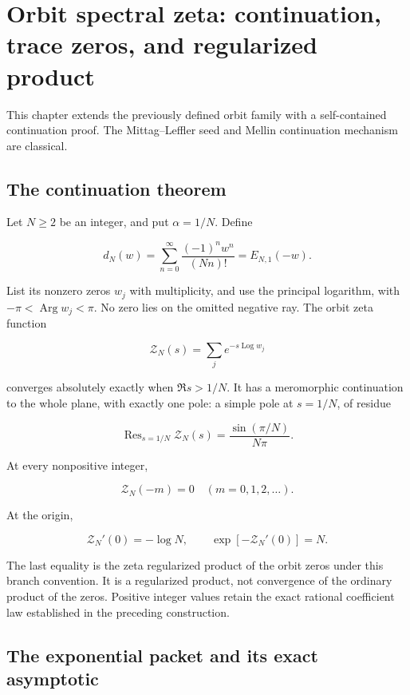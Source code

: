 \hypertarget{orbit-spectral-zeta-continuation-trace-zeros-and-regularized-product}{%
\chapter[Spectral continuation and regularization]{Orbit spectral zeta: continuation, trace zeros, and regularized
product}\label{app:spectral}\label{orbit-spectral-zeta-continuation-trace-zeros-and-regularized-product}}

This chapter extends the previously defined orbit family with a self-contained continuation proof.
The Mittag--Leffler seed and Mellin continuation mechanism are classical.

\hypertarget{the-completed-result}{%
\section{The continuation theorem}\label{the-completed-result}}

Let \(N\ge2\) be an integer, and put \(\alpha=1/N\). Define

\[
d_N(w)=\sum_{n=0}^{\infty}\frac{(-1)^n w^n}{(Nn)!}
      =E_{N,1}(-w).
\]

List its nonzero zeros \(w_j\) with multiplicity, and use the principal
logarithm, with \(-\pi<\operatorname{Arg}w_j<\pi\). No zero lies on the
omitted negative ray. The orbit zeta function

\[
\mathcal Z_N(s)=\sum_j e^{-s\operatorname{Log}w_j}
\]

converges absolutely exactly when \(\Re s>1/N\). It has a meromorphic
continuation to the whole plane, with exactly one pole: a simple pole at
\(s=1/N\), of residue

\[
\boxed{\operatorname{Res}_{s=1/N}\mathcal Z_N(s)
      =\frac{\sin(\pi/N)}{N\pi}.}
\]

At every nonpositive integer,

\[
\boxed{\mathcal Z_N(-m)=0\quad(m=0,1,2,\ldots).}
\]

At the origin,

\[
\boxed{\mathcal Z_N'(0)=-\log N,\qquad
       \exp[-\mathcal Z_N'(0)]=N.}
\]

The last equality is the zeta regularized product of the orbit zeros
under this branch convention. It is a regularized product, not
convergence of the ordinary product of the zeros. Positive integer values retain the exact rational coefficient law established in the preceding construction.

\hypertarget{the-exponential-packet-and-its-exact-asymptotic}{%
\section{The exponential packet and its exact
asymptotic}\label{the-exponential-packet-and-its-exact-asymptotic}}

